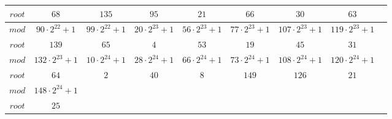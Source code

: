 \documentclass[12pt]{article}
\begin{document}
\begin{tabular}{|c|c|c|c|c|c|c|c|c|}
$root$& $68$& $135$& $95$& $21$& $66$& $30$& $63$\\
\hline


$mod$& $90\cdot 2^{22}+1$& $99\cdot 2^{22}+1$& $20\cdot 2^{23}+1$& $56\cdot 2^{23}+1$& $77\cdot 2^{23}+1$& $107\cdot 2^{23}+1$& $119\cdot 2^{23}+1$\\
\hline

$root$& $139$& $65$& $4$& $53$& $19$& $45$& $31$\\
\hline


$mod$& $132\cdot 2^{23}+1$& $10\cdot 2^{24}+1$& $28\cdot 2^{24}+1$& $66\cdot 2^{24}+1$& $73\cdot 2^{24}+1$& $108\cdot 2^{24}+1$& $120\cdot 2^{24}+1$\\
\hline

$root$& $64$& $2$& $40$& $8$& $149$& $126$& $21$\\
\hline


$mod$& $148\cdot 2^{24}+1$\\
\hline

$root$& $25$\\
\hline
\end{tabular}
\end{document}
